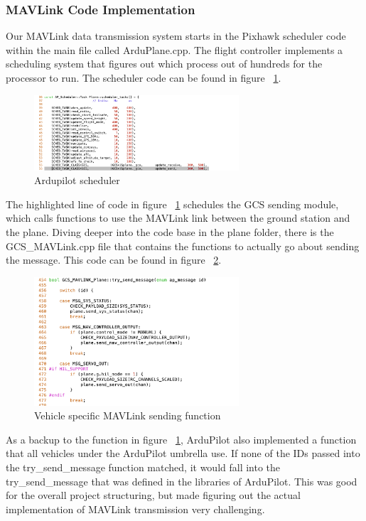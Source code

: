 \documentclass[12pt,journal,compsoc]{IEEEtran}
\begin{document}
\subsubsection{MAVLink Code Implementation}
Our MAVLink data transmission system starts in the Pixhawk scheduler code within the main file called ArduPlane.cpp. The flight controller implements a scheduling system that figures out which process out of hundreds for the processor to run. The scheduler code can be found in figure ~\ref{mavSched}.
\begin{figure}[h!]
\hspace*{0cm}
\centering
\includegraphics[width=3in]{Scheduler.png}
\caption{Ardupilot scheduler}
\label{mavSched}
\end{figure}

The highlighted line of code in figure ~\ref{mavSched} schedules the GCS sending module, which calls functions to use the MAVLink link between the ground station and the plane. Diving deeper into the code base in the plane folder, there is the GCS\_MAVLink.cpp file that contains the functions to actually go about sending the message. This code can be found in figure ~\ref{gcsMav}.

\begin{figure}[h!]
\hspace*{0cm}
\centering
\includegraphics[width=3in]{GCS_Mavlink.png}
\caption{Vehicle specific MAVLink sending function}
\label{gcsMav}
\end{figure}

As a backup to the function in figure ~\ref{mavSched}, ArduPilot also implemented a function that all vehicles under the ArduPilot umbrella use. If none of the IDs passed into the try\_send\_message function matched, it would fall into the try\_send\_message that was defined in the libraries of ArduPilot. This was good for the overall project structuring, but made figuring out the actual implementation of MAVLink transmission very challenging. 
\end{document}
